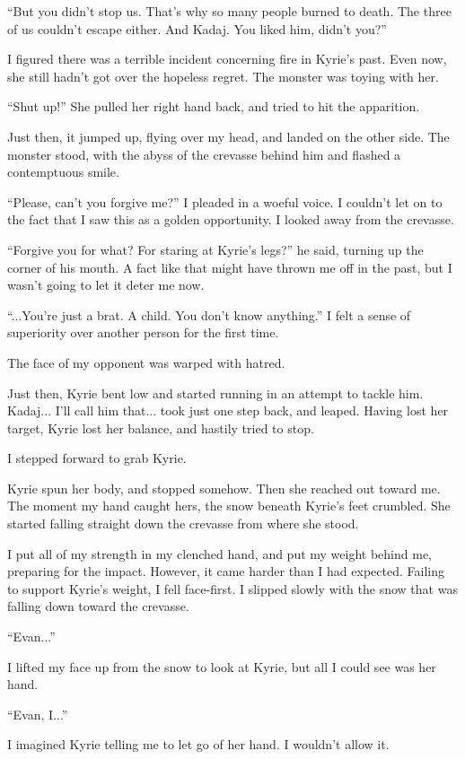 \documentclass[oneside]{book}
\begin{document}
“But you didn’t stop us. That’s why so many people burned to death. The three of us couldn’t escape either. And Kadaj. You liked him, didn’t you?”

I figured there was a terrible incident concerning fire in Kyrie’s past. Even now, she still hadn’t got over the hopeless regret. The monster was toying with her.

“Shut up!” She pulled her right hand back, and tried to hit the apparition.

Just then, it jumped up, flying over my head, and landed on the other side. The monster stood, with the abyss of the crevasse behind him and flashed a contemptuous smile.

“Please, can’t you forgive me?” I pleaded in a woeful voice. I couldn’t let on to the fact that I saw this as a golden opportunity. I looked away from the crevasse.

“Forgive you for what? For staring at Kyrie’s legs?” he said, turning up the corner of his mouth. A fact like that might have thrown me off in the past, but I wasn’t going to let it deter me now.

“...You’re just a brat. A child. You don’t know anything.” I felt a sense of superiority over another person for the first time.

The face of my opponent was warped with hatred.

Just then, Kyrie bent low and started running in an attempt to tackle him. Kadaj... I’ll call him that... took just one step back, and leaped. Having lost her target, Kyrie lost her balance, and hastily tried to stop.

I stepped forward to grab Kyrie.

Kyrie spun her body, and stopped somehow. Then she reached out toward me. The moment my hand caught hers, the snow beneath Kyrie’s feet crumbled. She started falling straight down the crevasse from where she stood.

I put all of my strength in my clenched hand, and put my weight behind me, preparing for the impact. However, it came harder than I had expected. Failing to support Kyrie’s weight, I fell face-first. I slipped slowly with the snow that was falling down toward the crevasse.

“Evan...”

I lifted my face up from the snow to look at Kyrie, but all I could see was her hand.

“Evan, I...”

I imagined Kyrie telling me to let go of her hand. I wouldn’t allow it.
\end{document}
